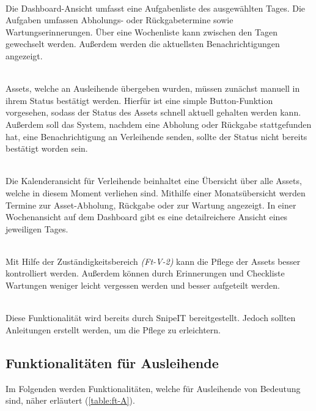 {\sffamily\color{maincolor}{Ft-V-1 | Dashboard }}\\
Die Dashboard-Ansicht umfasst eine Aufgabenliste des ausgewählten Tages. Die Aufgaben umfassen
Abholungs- oder Rückgabetermine sowie Wartungserinnerungen. Über eine Wochenliste kann zwischen
den Tagen gewechselt werden. Außerdem werden die aktuellsten Benachrichtigungen angezeigt.

    {\sffamily\color{maincolor}{Ft-V-2 | Bearbeiten des Assetstatus }}\\
Assets, welche an Ausleihende übergeben wurden, müssen zunächst manuell in ihrem Status bestätigt
werden. Hierfür ist eine simple Button-Funktion vorgesehen, sodass der Status des Assets schnell aktuell
gehalten werden kann. Außerdem soll das System, nachdem eine Abholung oder Rückgabe stattgefunden
hat, eine Benachrichtigung an Verleihende senden, sollte der Status nicht bereits bestätigt worden
sein.

    {\sffamily\color{maincolor}{Ft-B-4 | Kalenderansicht für Verleihende}}\\
Die Kalenderansicht für Verleihende beinhaltet eine Übersicht über alle Assets, welche in diesem Moment
verliehen sind. Mithilfe einer Monatsübersicht werden Termine zur Asset-Abholung, Rückgabe oder zur
Wartung angezeigt. In einer Wochenansicht auf dem Dashboard gibt es eine detailreichere Ansicht
eines jeweiligen Tages.


    {\sffamily\color{maincolor}{Ft-V-3 | Pflege von Assets   }}\\
Mit Hilfe der Zuständigkeitsbereich \textit{(Ft-V-2)} kann die Pflege der Assets besser kontrolliert
werden. Außerdem können durch Erinnerungen und Checkliste Wartungen weniger leicht vergessen werden
und besser aufgeteilt werden.


    {\sffamily\color{maincolor}{Ft-V-4 | Pflege der Datenbank }}\\
Diese Funktionalität wird bereits durch SnipeIT bereitgestellt. Jedoch sollten Anleitungen
erstellt werden, um die Pflege zu erleichtern. 

\subsection{Funktionalitäten für Ausleihende}
Im Folgenden werden Funktionalitäten, welche für Ausleihende von Bedeutung sind, näher erläutert
(\ref{table:ft-A}).

